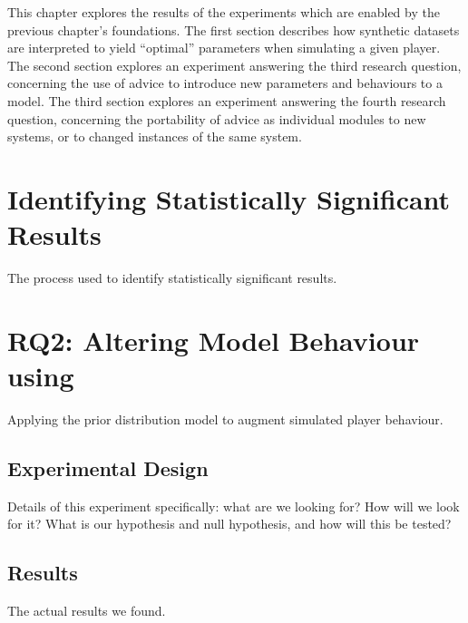 This chapter explores the results of the experiments which are enabled by the
previous chapter's foundations.
The first section describes how synthetic datasets are interpreted to yield
``optimal'' parameters when simulating a given player.
The second section explores an experiment answering the third research question,
concerning the use of advice to introduce new parameters and behaviours to a model.
The third section explores an experiment answering the fourth research question,
concerning the portability of advice as individual modules to new systems, or to
changed instances of the same system.





\section{Identifying Statistically Significant Results}
\label{exp_identiying_statistically_significant_results}

The process used to identify statistically significant results.





\section{RQ2: Altering Model Behaviour using \AspectOrientation}
\label{rq2_results}

Applying the prior distribution model to augment simulated player behaviour.

\subsection{Experimental Design}

Details of this experiment specifically: what are we looking for? How will we
look for it? What is our hypothesis and null hypothesis, and how will this be
tested?

\subsection{Results}

The actual results we found.



